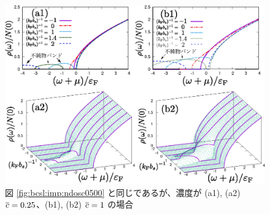 \begin{figure}[t]
\centering
\includegraphics[width=130mm]{eps/normal-dos-c2-2.eps}
\caption{図 \ref{fig:bcsl:imp:ndosc0500} と同じであるが、濃度が (a1), (a2) $\overline{c}=0.25$、(b1), (b2) $\overline{c}=1$ の場合}
\label{fig:bcsl:imp:ndoscccc}
\end{figure}



